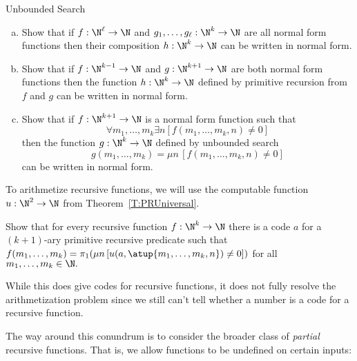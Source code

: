 \begin{unit}{Unbounded Search}
\begin{problem}\mbox{}
\begin{enumerate}[(a)]
\item Show that if \(f:\N^\ell\to\N\) and \(g_1,\dots,g_\ell:\N^k\to\N\) are all normal form functions then their composition \(h:\N^k\to\N\) can be written in normal form.
\item Show that if \(f:\N^{k-1}\to\N\) and \(g:\N^{k+1}\to\N\) are both normal form functions then the function \(h:\N^k\to\N\) defined by primitive recursion from \(f\) and \(g\) can be written in normal form.
\item Show that if \(f:\N^{k+1}\to\N\) is a normal form function such that \[\forall m_1,\dots,m_k \exists n[f(m_1,\dots,m_k,n) \neq 0]\] then the function \(g:\N^k\to\N\) defined by unbounded search\[g(m_1,\dots,m_k) = \mu n\,[f(m_1,\dots,m_k,n) \neq 0]\] can be written in normal form.
\end{enumerate}
\end{problem}

To arithmetize recursive functions, we will use the computable function \(u:\N^2\to\N\) from Theorem~\ref{T:PRUniversal}.

\begin{problem}
  Show that for every recursive function \(f:\N^k\to\N\) there is a code \(a\) for a \((k+1)\)-ary primitive recursive predicate such that \(f(m_1,\dots,m_k) = \pi_1(\mu n\,[u(a,\atup{m_1,\dots,m_k,n}) \neq 0])\) for all \(m_1,\dots,m_k \in \N.\)
\end{problem}

\noindent
While this does give codes for recursive functions, it does not fully resolve the arithmetization problem since we still can't tell whether a number is a code for a recursive function.

The way around this conundrum is to consider the broader class of \textit{partial} recursive functions.
That is, we allow functions to be undefined on certain inputs:


\end{unit}
